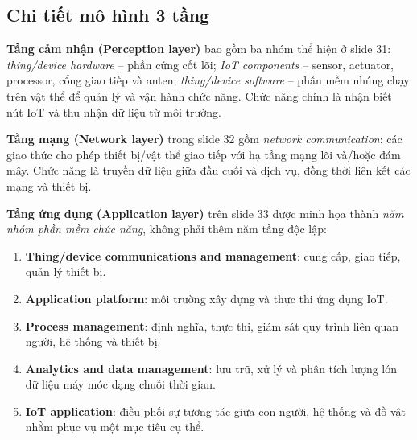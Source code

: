 \subsection{Chi tiết mô hình 3 tầng}
\textbf{Tầng cảm nhận (Perception layer)} bao gồm ba nhóm thể hiện ở slide 31: \emph{thing/device hardware} -- phần cứng cốt lõi; \emph{IoT components} -- sensor, actuator, processor, cổng giao tiếp và anten; \emph{thing/device software} -- phần mềm nhúng chạy trên vật thể để quản lý và vận hành chức năng. Chức năng chính là nhận biết nút IoT và thu nhận dữ liệu từ môi trường.

\textbf{Tầng mạng (Network layer)} trong slide 32 gồm \emph{network communication}: các giao thức cho phép thiết bị/vật thể giao tiếp với hạ tầng mạng lõi và/hoặc đám mây. Chức năng là truyền dữ liệu giữa đầu cuối và dịch vụ, đồng thời liên kết các mạng và thiết bị.

\textbf{Tầng ứng dụng (Application layer)} trên slide 33 được minh họa thành \emph{năm nhóm phần mềm chức năng}, không phải thêm năm tầng độc lập:
\begin{enumerate}
\item \textbf{Thing/device communications and management}: cung cấp, giao tiếp, quản lý thiết bị.
\item \textbf{Application platform}: môi trường xây dựng và thực thi ứng dụng IoT.
\item \textbf{Process management}: định nghĩa, thực thi, giám sát quy trình liên quan người, hệ thống và thiết bị.
\item \textbf{Analytics and data management}: lưu trữ, xử lý và phân tích lượng lớn dữ liệu máy móc dạng chuỗi thời gian.
\item \textbf{IoT application}: điều phối sự tương tác giữa con người, hệ thống và đồ vật nhằm phục vụ một mục tiêu cụ thể.
\end{enumerate}

